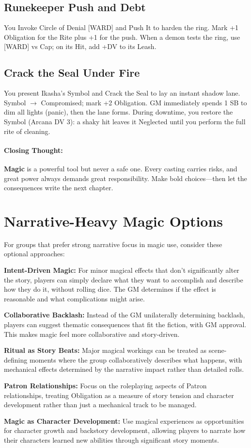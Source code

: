 \subsection*{Runekeeper Push and Debt}
You Invoke Circle of Denial [WARD] and Push It to harden the ring. Mark +1 Obligation for the Rite plus +1 for the push. When a demon tests the ring, use [WARD] vs Cap; on its Hit, add +DV to its Leash.

\subsection*{Crack the Seal Under Fire}
You present Ikasha's Symbol and Crack the Seal to lay an instant shadow lane. Symbol $\rightarrow$ Compromised; mark +2 Obligation. GM immediately spends 1 SB to dim all lights (panic), then the lane forms. During downtime, you restore the Symbol (Arcana DV 3): a shaky hit leaves it Neglected until you perform the full rite of cleaning.

\paragraph{Closing Thought:}
\textbf{Magic} is a powerful tool but never a safe one. Every casting carries risks, and great power always demands great responsibility. Make bold choices—then let the consequences write the next chapter.

\section{Narrative-Heavy Magic Options}

For groups that prefer strong narrative focus in magic use, consider these optional approaches:

\textbf{Intent-Driven Magic:} For minor magical effects that don't significantly alter the story, players can simply declare what they want to accomplish and describe how they do it, without rolling dice. The GM determines if the effect is reasonable and what complications might arise.

\textbf{Collaborative Backlash:} Instead of the GM unilaterally determining backlash, players can suggest thematic consequences that fit the fiction, with GM approval. This makes magic feel more collaborative and story-driven.

\textbf{Ritual as Story Beats:} Major magical workings can be treated as scene-defining moments where the group collaboratively describes what happens, with mechanical effects determined by the narrative impact rather than detailed rolls.

\textbf{Patron Relationships:} Focus on the roleplaying aspects of Patron relationships, treating Obligation as a measure of story tension and character development rather than just a mechanical track to be managed.

\textbf{Magic as Character Development:} Use magical experiences as opportunities for character growth and backstory development, allowing players to narrate how their characters learned new abilities through significant story moments.
